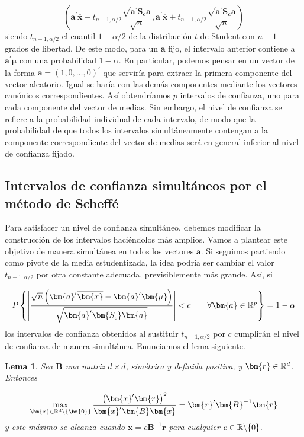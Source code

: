 \documentclass[
  a4paper,
  oneside]{scrbook}
\newtheorem{lemma}{Lema}[chapter]
\theoremstyle{definition}
\theoremstyle{definition}
\theoremstyle{definition}
\theoremstyle{definition}
\theoremstyle{remark}
\begin{document}
\[\left(\bm{a}^\prime{}\overline{\bm{x}}-t_{n-1,\alpha/2}\frac{\sqrt{\bm{a}^\prime{}\bm{S_c}\bm{a}}}{\sqrt{n}},
\bm{a}^\prime{}\overline{\bm{x}}+t_{n-1,\alpha/2}\frac{\sqrt{\bm{a}^\prime{}\bm{S_c}\bm{a}}}{\sqrt{n}}\right)\]
siendo \(t_{n-1,\alpha/2}\) el cuantil \(1-\alpha/2\) de la distribución \(t\)
de Student con \(n-1\) grados de libertad. De este modo, para un \(\bm{a}\)
fijo, el intervalo anterior contiene a \(\bm{a}^\prime{}\bm{\mu}\) con una
probabilidad \(1-\alpha\). En particular, podemos pensar en un vector de
la forma \(\bm{a}=(1,0,\ldots,0)^\prime{}\) que serviría para extraer la
primera componente del vector aleatorio. Igual se haría con las demás
componentes mediante los vectores canónicos correspondientes. Así
obtendríamos \(p\) intervalos de confianza, uno para cada componente del
vector de medias. Sin embargo, el nivel de confianza se refiere a la
probabilidad individual de cada intervalo, de modo que la probabilidad
de que todos los intervalos simultáneamente contengan a la componente
correspondiente del vector de medias será en general inferior al nivel
de confianza fijado.

\subsection{Intervalos de confianza simultáneos por el método de Scheffé}\label{intervalos-de-confianza-simultaneos-por-el-metodo-de-scheffe}

Para satisfacer un nivel de confianza simultáneo, debemos modificar la
construcción de los intervalos haciéndolos más amplios. Vamos a plantear
este objetivo de manera simultánea en todos los vectores \(\bm{a}\). Si
seguimos partiendo como pivote de la media estudentizada, la idea podría
ser cambiar el valor \(t_{n-1,\alpha/2}\) por otra constante adecuada,
previsiblemente más grande. Así, si

\[P\left\{ \left|\frac{\sqrt{n}\left(\bm{a}^\prime{}\overline{\bm{x}}-\bm{a}^\prime{}\bm{\mu}\right)}{\sqrt{\bm{a}^\prime{}\bm{S_c}\bm{a}}}\right| < c
\qquad \forall \bm{a}\in{\Bbb R}^p\right\}=1-\alpha\] los intervalos de
confianza obtenidos al sustituir \(t_{n-1,\alpha/2}\) por \(c\) cumplirán el
nivel de confianza de manera simultánea. Enunciamos el lema siguiente.

\begin{lemma}
\protect\hypertarget{lem:unnamed-chunk-20}{}\label{lem:unnamed-chunk-20}Sea \(\bm{B}\) una matriz \(d\times d\), simétrica y definida positiva, y
\(\bm{r}\in {\Bbb R}^d\). Entonces

\[\max_{\bm{x}\in{\Bbb{R}}^d\backslash\{\bm{0}\}}\frac{\left(\bm{x}^\prime{}\bm{r}\right)^2}{\bm{x}^\prime{}\bm{B}\bm{x}}=\bm{r}^\prime{}\bm{B}^{-1}\bm{r}\]
y este máximo se alcanza cuando \(\bm{x}=c\bm{B}^{-1}\bm{r}\) para
cualquier \(c\in {\Bbb R}\backslash \{0\}\).
\end{lemma}
\end{document}
